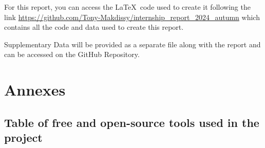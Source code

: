 \documentclass[11pt,a4paper]{article}
\begin{document}
For this report, you can access the \LaTeX\ code used to create it following the link \url{https://github.com/Tony-Makdissy/internship_report_2024_autumn} which contains all the code and data used to create this report.

Supplementary Data will be provided as a separate file along with the report and can be accessed on the GitHub Repository.

\printbibliography

\newpage

\section*{Annexes}

\subsection*{Table of free and open-source tools used in the project}
\end{document}
